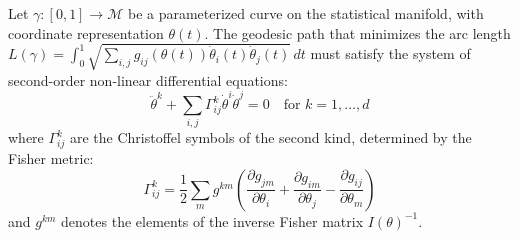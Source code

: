 \begin{theorem}
Let $\gamma : [0, 1] \to \mathcal{M}$ be a parameterized curve on the statistical manifold, with coordinate representation $\theta(t)$. The geodesic path that minimizes the arc length $L(\gamma) = \int_0^1 \sqrt{ \sum_{i,j} g_{ij}(\theta(t)) \dot{\theta}_i(t) \dot{\theta}_j(t) } \, dt$ must satisfy the system of second-order non-linear differential equations:
\begin{equation}
\ddot{\theta}^k + \sum_{i,j} \Gamma^k_{ij} \dot{\theta}^i \dot{\theta}^j = 0 \quad \text{for } k = 1, \dots, d
\end{equation}
where $\Gamma^k_{ij}$ are the Christoffel symbols of the second kind, determined by the Fisher metric:
\begin{equation}
\Gamma^k_{ij} = \frac{1}{2} \sum_m g^{km} \left( \frac{\partial g_{jm}}{\partial \theta_i} + \frac{\partial g_{im}}{\partial \theta_j} - \frac{\partial g_{ij}}{\partial \theta_m} \right)
\end{equation}
and $g^{km}$ denotes the elements of the inverse Fisher matrix $I(\theta)^{-1}$.
\end{theorem}

